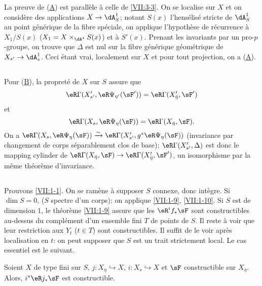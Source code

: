 La preuve de (\hyperlink{VII:3-A}{A}) est parall\`ele \`a celle de 
\ref{VII:3-3}. On se localise sur $X$ et on consid\`ere des applications 
$X\to \dA_S^1$; notant $S(x)$ l'hens\'elis\'e stricte de $\dA_S^1$ au point 
g\'en\'erique de la fibre sp\'eciale, on applique l'hypoth\`ese de r\'ecurrence 
\`a $X_1/S(x)$ ($X_1=X\times_{\dA^1} S(x)$) et \`a $S'(x)$. Prenant les 
invariants par un pro-$p$-groupe, on trouve que $\Delta$ est nul sur la fibre 
g\'en\'erique g\'eom\'etrique de $X_{s'} \to \dA_s^1$. Ceci \'etant vrai, 
localement sur $X$ et pour tout projection, on a (\hyperlink{VII:3-A}{A}). 





\subsection{}\label{VII:3-9}

Pour (\hyperlink{VII:3-B}{B}), la propret\'e de $X$ sur $S$ assure que 
\[
  \eR\Gamma(X_{s'}',\eR\Psi_{\eta'}(\sF')) = \eR\Gamma(X_{\bar\eta}',\sF') 
\]
et
\[
  \eR\Gamma(X_s,\eR\Psi_\eta(\sF)) = \eR\Gamma(X_{\bar\eta},\sF) \text{.} 
\]
On a 
$\eR\Gamma(X_s,\eR\Psi_\eta(\sF))\iso \eR\Gamma(X_{s'}',g^\ast\eR\Psi_\eta(\sF))$
(invariance par changement de corps s\'eparablement clos de base); 
$\eR\Gamma(X_{s'}', \Delta)$ est donc le mapping cylinder de 
$\eR\Gamma(X_{\bar\eta},\sF) \to \eR\Gamma(X_{\bar\eta}',\sF')$, un 
isomorphisme par la m\^eme th\'eor\`eme d'invariance. 





\subsection{}\label{VII:3-10}

Prouvons \ref{VII:1-1}. On se ram\`ene \`a supposer $S$ connexe, donc 
int\`egre. Si $\dim S=0$, ($S$ spectre d'un corps); on applique \ref{VII:1-9}, 
\ref{VII:1-10}. Si $S$ est de dimension $1$, le th\'eor\`eme \ref{VII:1-9} 
assure que les $\eR^i f_\ast \sF$ sont constructibles au-dessus du compl\'ement 
d'un ensemble fini $T$ de points de $S$. Il reste \`a voir que leur restriction 
aux $Y_t$ ($t\in T$) sont constructibles. Il suffit de le voir apr\`es 
localisation en $t$: on peut supposer que $S$ est un trait strictement local. 
Le cas essentiel est le suivant. 





\begin{lemma_}\label{VII:3-11}
Soient $X$ de type fini sur $S$, $j:X_\eta\hookrightarrow X$, 
$i:X_s\hookrightarrow X$ et $\sF$ constructible sur $X_\eta$. Alors, 
$i^\ast\eR j_\ast \sF$ est constructible. 
\end{lemma_}

